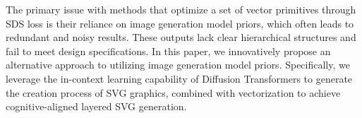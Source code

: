 The primary issue with methods that optimize a set of vector primitives through SDS loss is their reliance on image generation model priors, which often leads to redundant and noisy results. These outputs lack clear hierarchical structures and fail to meet design specifications. In this paper, we innovatively propose an alternative approach to utilizing image generation model priors. Specifically, we leverage the in-context learning capability of Diffusion Transformers to generate the creation process of SVG graphics, combined with vectorization to achieve cognitive-aligned layered SVG generation.






